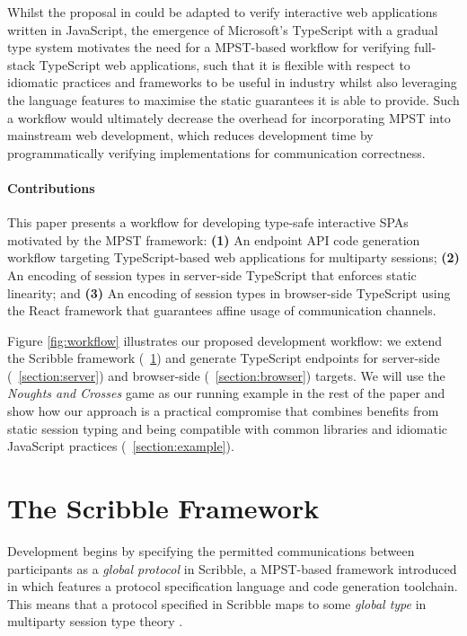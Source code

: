 \documentclass[submission,copyright,creativecommons]{eptcs}
\newcommand{\sectionref}[1]{\textsection~\ref{#1}}
\begin{document}
Whilst the proposal in \cite{Python2017} could be adapted to verify interactive web applications written in JavaScript, the emergence of Microsoft's TypeScript \cite{TypeScript} with a gradual type system motivates the need for a MPST-based workflow for verifying full-stack TypeScript web applications, such that it is flexible with respect to idiomatic practices and frameworks to be useful in industry whilst also leveraging the language features to maximise the static guarantees it is able to provide. Such a workflow would ultimately decrease the overhead for incorporating MPST into mainstream web development, which reduces development time by programmatically verifying implementations for communication correctness.

\paragraph{Contributions}
This paper presents a workflow for developing type-safe interactive SPAs motivated by the MPST framework: \textbf{(1)} An endpoint API code generation workflow targeting TypeScript-based web applications for multiparty sessions; \textbf{(2)} An encoding of session types in server-side TypeScript that enforces static linearity; and \textbf{(3)} An encoding of session types in browser-side TypeScript using the React framework that guarantees affine usage of communication channels.

Figure \ref{fig:workflow} illustrates our proposed development workflow: we extend the Scribble framework (\sectionref{section:scribble}) and generate TypeScript endpoints for server-side (\sectionref{section:server}) and browser-side (\sectionref{section:browser}) targets. We will use the \textit{Noughts and Crosses} game as our running example in the rest of the paper and show how our approach is a practical compromise that combines benefits from static session typing and being compatible with common libraries and idiomatic JavaScript practices (\sectionref{section:example}).

\section{The Scribble Framework}
\label{section:scribble}
Development begins by specifying the permitted communications between participants as a \textit{global protocol} in Scribble, a MPST-based framework introduced in \cite{Scribble} which features a protocol specification language and code generation toolchain. This means that a protocol specified in Scribble maps to some \textit{global type} in multiparty session type theory \cite{MPST}.
\end{document}
